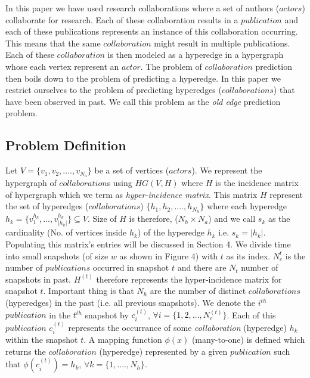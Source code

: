\documentclass{sig-alternate}
\begin{document}
In this paper we have used research collaborations where a set of authors ($actors$) collaborate for research. Each of these collaboration results in a $publication$ and each of these publications represents an instance of this collaboration occurring. This means that the same $collaboration$ might result in multiple publications. Each of these $collaboration$ is then modeled as a hyperedge in a hypergraph whose each vertex represent an $actor$. The problem of $collaboration$ prediction then boils down to the problem of predicting a hyperedge. In this paper we restrict ourselves to the problem of predicting hyperedges ($collaborations$) that have been observed in past. We call this problem as the \textit{old edge} prediction problem. 



\subsection{Problem Definition}

Let $V = \{v_1,v_2,....,v_{N_a}\}$ be a set of vertices ($actors$). We represent the hypergraph of $collaboration$s using $HG(V,H)$ where $H$ is the incidence matrix of hypergraph which we term as \textit{hyper-incidence matrix}. This matrix \(H\) represent the set of hyperedges ($collaborations$) $\{h_1,h_2,....,h_{N_h}\}$ where each hyperedge $h_{k} = \{ v_{1}^{h_k},..., v_{|h_k|}^{h_k} \} \subseteq V$. Size of $H$ is therefore, ($N_h \times N_a$) and we call $s_k$ as the cardinality (No. of vertices inside $h_k$) of the hyperedge $h_k$ i.e. $s_k = |h_k|$. Populating this matrix's entries will be discussed in Section 4. We divide time into small snapshots (of size $w$ as shown in Figure 4) with $t$ as its index. $N_{c}^{t}$ is the number of $publications$ occurred in snapshot $t$ and there are $N_t$ number of snapshots in past. \(H^{(t)}\) therefore represents the hyper-incidence matrix for snapshot $t$. Important thing is that $N_h$ are the number of distinct $collaborations$ (hyperedges) in the past (i.e. all previous snapshots). We denote the $i^{th}$ $publication$ in the $t^{th}$ snapshot by \(c_{i}^{(t)}\), \(\forall i = \{1,2,...,N_{c}^{(t)}\}\). Each of this $publication$ $c_i^{(t)}$ represents the occurrance of some \textit{collaboration} (hyperedge) $h_k$ within the snapshot $t$. A mapping function $\phi(x)$ (many-to-one) is defined which returns the $collaboration$ (hyperedge) represented by a given $publication$ such that $\phi(c_i^{(t)})=h_k $, $\forall k=\{1,....,N_h\}$. 
\end{document}
